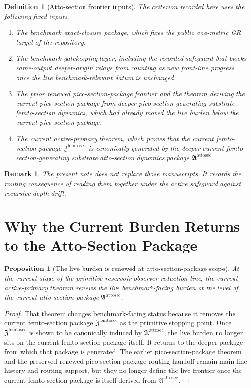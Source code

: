 \documentclass[11pt]{article}
\newcommand{\FemtoSectionPackage}{\mathfrak Z^{\mathrm{femtosec}}}
\newcommand{\AttoSectionPackage}{\mathfrak A^{\mathrm{attosec}}}
\newtheorem{definition}{Definition}
\newtheorem{proposition}{Proposition}
\newtheorem{remark}{Remark}
\begin{document}
\begin{definition}[Atto-section frontier inputs]
The criterion recorded here uses the following fixed inputs.
\begin{enumerate}
    \item The benchmark exact-closure package, which fixes the public one-metric GR target of the repository.
    \item The benchmark gatekeeping layer, including the recorded safeguard that blocks same-output deeper-origin relays from counting as new front-line progress once the live benchmark-relevant datum is unchanged.
    \item The prior renewed pico-section-package frontier and the theorem deriving the current pico-section package from deeper pico-section-generating substrate femto-section dynamics, which had already moved the live burden below the current pico-section package.
    \item The current active-primary theorem, which proves that the current femto-section package \(\FemtoSectionPackage\) is canonically generated by the deeper current femto-section-generating substrate atto-section dynamics package \(\AttoSectionPackage\).
\end{enumerate}
\end{definition}

\begin{remark}
The present note does not replace those manuscripts. It records the routing consequence of reading them together under the active safeguard against recursive depth drift.
\end{remark}

\section{Why the Current Burden Returns to the Atto-Section Package}

\begin{proposition}[The live burden is renewed at atto-section-package scope]
At the current stage of the primitive-reservoir observer-reduction line, the current active-primary theorem renews the live benchmark-facing burden at the level of the current atto-section package \(\AttoSectionPackage\).
\end{proposition}

\begin{proof}
That theorem changes benchmark-facing status because it removes the current femto-section package \(\FemtoSectionPackage\) as the primitive stopping point. Once \(\FemtoSectionPackage\) is shown to be canonically induced by \(\AttoSectionPackage\), the live burden no longer sits on the current femto-section package itself. It returns to the deeper package from which that package is generated. The earlier pico-section-package theorem and the preserved renewed pico-section-package routing handoff remain main-line history and routing support, but they no longer define the live frontier once the current femto-section package is itself derived from \(\AttoSectionPackage\).
\end{proof}
\end{document}
